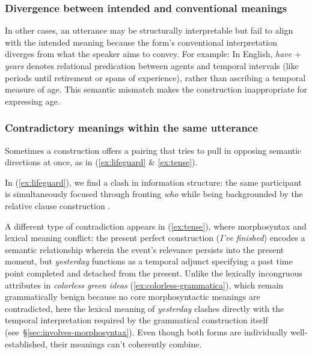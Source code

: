 \subsubsection{Divergence between intended and conventional meanings}

In other cases, an utterance may be structurally interpretable but fail to align with the intended meaning because the form’s conventional interpretation diverges from what the speaker aims to convey. For example:
\label{ex:have-years}
\z
In English, \textit{have }+\textit{ years} denotes relational predication between agents and temporal intervals (like periods until retirement or spans of experience), rather than ascribing a temporal measure of age. This semantic mismatch makes the construction inappropriate for expressing age.

\subsubsection{Contradictory meanings within the same utterance}

Sometimes a construction offers a pairing that tries to pull in opposing semantic directions at once, as in (\ref{ex:lifeguard} \& \ref{ex:tense}).

\z
{}
\z

In (\ref{ex:lifeguard}), we find a clash in information structure: the same participant is simultaneously focused through fronting \textit{who} while being backgrounded by the relative clause construction \autocite{CuneoGoldberg2023}.

A different type of contradiction appears in (\ref{ex:tense}), where morphosyntax and lexical meaning conflict: the present perfect construction (\textit{I've finished}) encodes a semantic relationship wherein the event's relevance persists into the present moment, but \textit{yesterday} functions as a temporal adjunct specifying a past time point completed and detached from the present. Unlike the lexically incongruous attributes in \textit{colorless green ideas} (\ref{ex:colorless-grammatica}), which remain grammatically benign because no core morphosyntactic meanings are contradicted, here the lexical meaning of \textit{yesterday} clashes directly with the temporal interpretation required by the grammatical construction itself (see~\S\ref{sec:involves-morphosyntax}). Even though both forms are individually well-established, their meanings can't coherently combine.

